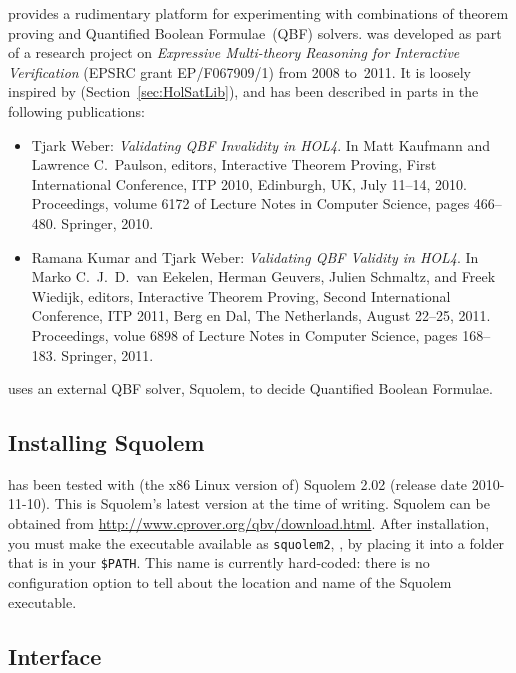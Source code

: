 
\setcounter{sessioncount}{0}

 provides a rudimentary platform for experimenting with
combinations of theorem proving and Quantified Boolean Formulae~(QBF)
solvers.   was developed as part of a research project
on {\it Expressive Multi-theory Reasoning for Interactive
  Verification} (EPSRC grant EP/F067909/1) from 2008 to~2011.  It is
loosely inspired by  (Section~\ref{sec:HolSatLib}), and
has been described in parts in the following publications:
\begin{itemize}
\item Tjark Weber: {\it Validating QBF Invalidity in HOL4}.  In Matt
  Kaufmann and Lawrence C.\ Paulson, editors, Interactive Theorem
  Proving, First International Conference, ITP 2010, Edinburgh, UK,
  July 11--14, 2010.  Proceedings, volume 6172 of Lecture Notes in
  Computer Science, pages 466--480.  Springer, 2010.
\item Ramana Kumar and Tjark Weber: {\it Validating QBF Validity in
  HOL4}.  In Marko C.\ J.\ D.\ van Eekelen, Herman Geuvers, Julien Schmaltz,
  and Freek Wiedijk, editors, Interactive Theorem Proving, Second International
  Conference, ITP 2011, Berg en Dal, The Netherlands, August 22--25, 2011.
  Proceedings, volue 6898 of Lecture Notes in Computer Science, pages 168--183.
  Springer, 2011.
\end{itemize}
 uses an external QBF solver, Squolem, to decide
Quantified Boolean Formulae.

\subsection{Installing Squolem}

 has been tested with (the x86 Linux version of) Squolem
2.02 (release date 2010-11-10).  This is Squolem's latest version at
the time of writing.  Squolem can be obtained from
\url{http://www.cprover.org/qbv/download.html}.  After installation,
you must make the executable available as {\tt squolem2}, \eg, by
placing it into a folder that is in your {\tt \$PATH}.  This name is
currently hard-coded: there is no configuration option to tell \HOL{}
about the location and name of the Squolem executable.

\subsection{Interface}
\label{qbf-interface}

